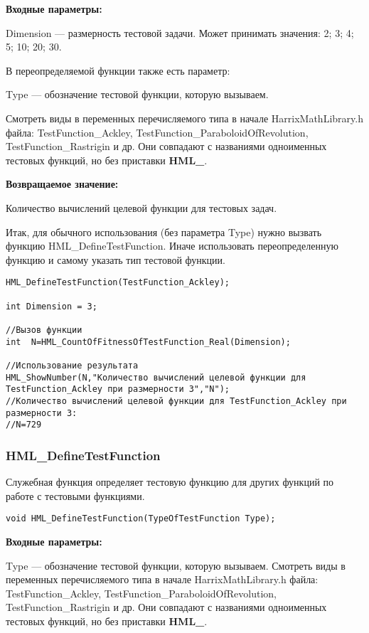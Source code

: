\documentclass[a4paper,12pt]{article}
\begin{document}
\textbf{Входные параметры:}

Dimension --- размерность тестовой задачи. Может принимать значения: 2; 3; 4; 5; 10; 20; 30.

В переопределяемой функции также есть параметр:
  
Type --- обозначение тестовой функции, которую вызываем. 

Смотреть виды в переменных перечисляемого типа в начале HarrixMathLibrary.h файла: TestFunction\_Ackley, TestFunction\_ParaboloidOfRevolution, TestFunction\_Rastrigin и др. Они совпадают с названиями одноименных тестовых функций, но без приставки \textbf{HML\_}.

\textbf{Возвращаемое значение:}
 
Количество вычислений целевой функции для тестовых задач.

Итак, для обычного использования (без параметра Type) нужно вызвать функцию HML\_DefineTestFunction. Иначе использовать переопределенную функцию и самому указать тип тестовой функции.


\begin{lstlisting}[label=code_use_HML_CountOfFitnessOfTestFunction_Real,caption=Пример использования]
HML_DefineTestFunction(TestFunction_Ackley);

int Dimension = 3;

//Вызов функции
int  N=HML_CountOfFitnessOfTestFunction_Real(Dimension);

//Использование результата
HML_ShowNumber(N,"Количество вычислений целевой функции для TestFunction_Ackley при размерности 3","N");
//Количество вычислений целевой функции для TestFunction_Ackley при размерности 3:
//N=729
\end{lstlisting}

\subsubsection{HML\_DefineTestFunction}\label{HML_DefineTestFunction}

Служебная функция определяет тестовую функцию для других функций по работе с тестовыми функциями.


\begin{lstlisting}[label=code_syntax_HML_DefineTestFunction,caption=Синтаксис]
void HML_DefineTestFunction(TypeOfTestFunction Type);
\end{lstlisting}

\textbf{Входные параметры:}
  
Type --- обозначение тестовой функции, которую вызываем.
Смотреть виды в переменных перечисляемого типа в начале HarrixMathLibrary.h файла: TestFunction\_Ackley, TestFunction\_ParaboloidOfRevolution, TestFunction\_Rastrigin и др. Они совпадают с названиями одноименных тестовых функций, но без приставки \textbf{HML\_}.
\end{document}
